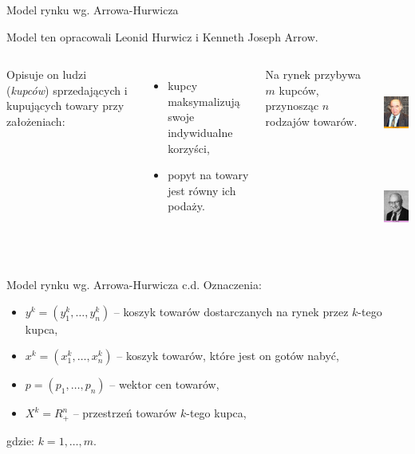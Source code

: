 \documentclass[a4paper, 11pt]{beamer}
\begin{document}
      \begin{frame}{Model rynku wg. Arrowa-Hurwicza}
	\begin{center}
	  Model ten opracowali Leonid Hurwicz i Kenneth Joseph Arrow.
	\end{center}
  
	\begin{columns}[c]
	    Opisuje on ludzi (\textit{kupców}) sprzedających i kupujących towary przy
	    założeniach:

	    \vskip10pt
	    \begin{itemize}
	      \item kupcy maksymalizują swoje indywidualne korzyści,
	      \item popyt na towary jest równy ich podaży.
	    \end{itemize}

	    \vskip20pt
	    Na rynek przybywa $m$ kupców, przynosząc $n$ rodzajów towarów.

	    \begin{center}
	      \includegraphics[height=3cm,width=2.5cm]{200px-Leonid_Hurwicz_x.jpg}\\
	      \includegraphics[height=3cm,width=2.5cm]{Kenneth_Arrow_x.jpg}

	    \end{center}
	\end{columns}
	
      \end{frame}

      \begin{frame}{Model rynku wg. Arrowa-Hurwicza c.d.}
	Oznaczenia:

	\begin{itemize}
	  \item $y^k=(y_1^k, \ldots, y_n^k)$ -- koszyk towarów dostarczanych na
	  rynek przez $k$-tego kupca,

	  \item $x^k=(x_1^k, \ldots, x_n^k)$ -- koszyk towarów, które jest on
	  gotów nabyć,

	  \item $p=(p_1, \ldots, p_n)$ -- wektor cen towarów,

	  \item $X^k=R_{+}^n$ -- przestrzeń towarów $k$-tego kupca,
	\end{itemize}

	gdzie: $k=1, \ldots, m$.

      \end{frame}
\end{document}
